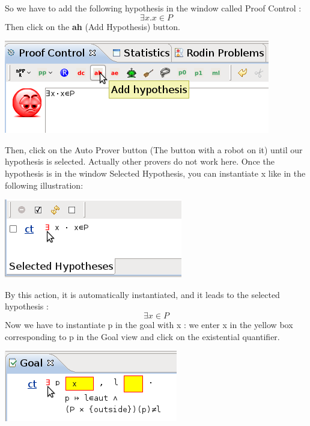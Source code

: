 So we have to add the following hypothesis in the window called \textsf{Proof Control} :
\[
\exists x.x \in P 
\]
Then click on the \textbf{ah} (Add Hypothesis) button.
\begin{center}
	\includegraphics[]{img/tutorial/tut_10_hypothesis.png}
\end{center}


Then, click on the Auto Prover button (The button with a robot on it) until our hypothesis is selected. Actually other provers do not work here.
Once the hypothesis is in the window \textsf{Selected Hypothesis}, you can instantiate x like in the following illustration:

\begin{center}
	\includegraphics[]{img/tutorial/tut_10_instantiate_x.png}
\end{center}

By this action, it is automatically instantiated, and it leads to the selected hypothesis :
\[
\exists x \in P 
\]
Now we have to instantiate p in the goal with x : we enter x in the yellow box corresponding to p in the Goal view and click on the existential quantifier.

\begin{center}
	\includegraphics[]{img/tutorial/tut_10_instantiate_p.png}
\end{center}

